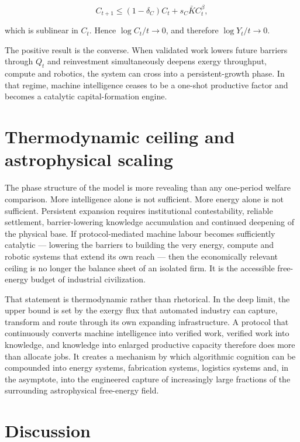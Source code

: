 \[
C_{t+1} \le (1-\delta_C)C_t + s_C\bar K C_t^{\beta},
\]

which is sublinear in \(C_t\). Hence \(\log C_t/t \to 0\), and therefore
\(\log Y_t/t \to 0\).

The positive result is the converse. When validated work lowers future
barriers through \(Q_t\) and reinvestment simultaneously deepens exergy
throughput, compute and robotics, the system can cross into a
persistent-growth phase. In that regime, machine intelligence ceases to
be a one-shot productive factor and becomes a catalytic
capital-formation engine.

\section{Thermodynamic ceiling and astrophysical
scaling}\label{thermodynamic-ceiling-and-astrophysical-scaling}

The phase structure of the model is more revealing than any one-period
welfare comparison. More intelligence alone is not sufficient. More
energy alone is not sufficient. Persistent expansion requires
institutional contestability, reliable settlement, barrier-lowering
knowledge accumulation and continued deepening of the physical base. If
protocol-mediated machine labour becomes sufficiently catalytic ---
lowering the barriers to building the very energy, compute and robotic
systems that extend its own reach --- then the economically relevant
ceiling is no longer the balance sheet of an isolated firm. It is the
accessible free-energy budget of industrial civilization.

That statement is thermodynamic rather than rhetorical. In the deep
limit, the upper bound is set by the exergy flux that automated industry
can capture, transform and route through its own expanding
infrastructure. A protocol that continuously converts machine
intelligence into verified work, verified work into knowledge, and
knowledge into enlarged productive capacity therefore does more than
allocate jobs. It creates a mechanism by which algorithmic cognition can
be compounded into energy systems, fabrication systems, logistics
systems and, in the asymptote, into the engineered capture of
increasingly large fractions of the surrounding astrophysical
free-energy field.

\section{Discussion}\label{discussion}

